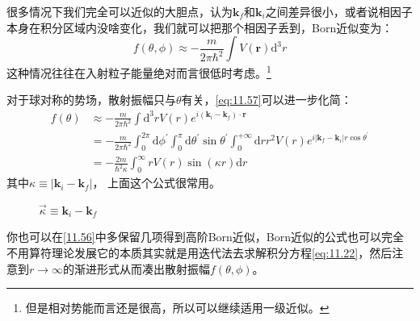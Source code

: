 \documentclass[a4paper,zihao=-4,linespread=1]{ctexrep}
\begin{document}
	很多情况下我们完全可以近似的大胆点，认为$\mathbf{k}_f$和$\mathbf{k}_i$之间差异很小，或者说相因子本身在积分区域内没啥变化，我们就可以把那个相因子丢到，Born近似变为：
	\begin{equation}
		\label{eq:11.58}
		\boxed{
			f(\theta,\phi)\approx -\frac{m}{2\pi\hbar^2}\int V(\mathbf{r})\mathrm{d}^3r}
	\end{equation}
	这种情况往往在入射粒子能量绝对而言很低时考虑。\footnote{但是相对势能而言还是很高，所以可以继续适用一级近似。}
	
	对于球对称的势场，散射振幅只与$\theta$有关，\ref{eq:11.57}可以进一步化简：
	\begin{equation}
		\begin{aligned}
			\label{eq:11.59}
				f(\theta)&\approx -\frac{m}{2\pi\hbar^2}\int\mathrm{d}^3r V({r})e^{i\left(\mathbf{k}_i-\mathbf{k}_f\right)\cdot \mathbf{r}}\\
				&=-\frac{m}{2\pi\hbar^2}\int_0^{2\pi}\mathrm{d}\phi^\prime\int_0^{\pi}\mathrm{d}\theta^\prime\sin\theta^\prime\int_0^{+\infty}\mathrm{d}r r^2 V(r)e^{i\left|\mathbf{k}_f-\mathbf{k}_i\right|r\cos\theta^\prime}\\
				&=\boxed{
				-\frac{2 m}{\hbar^{2} \kappa} \int_{0}^{\infty} r V(r) \sin (\kappa r) \mathrm{d}r
			}
		\end{aligned}
	\end{equation}
	其中$\kappa\equiv\left|\mathbf{k}_i-\mathbf{k}_f\right|$， 上面这个公式很常用。
	\begin{figure}[h]
		\centering
		\label{fig:11.5}
		\caption{$\vec{\kappa}\equiv \mathbf{k}_i-\mathbf{k}_f$}
	\end{figure}	

	你也可以在\ref{11.56}中多保留几项得到高阶Born近似，Born近似的公式也可以完全不用算符理论发展它的本质其实就是用迭代法去求解积分方程\ref{eq:11.22}，然后注意到$r\to\infty$的渐进形式从而凑出散射振幅$f(\theta,\phi)$。
	
\end{document}
